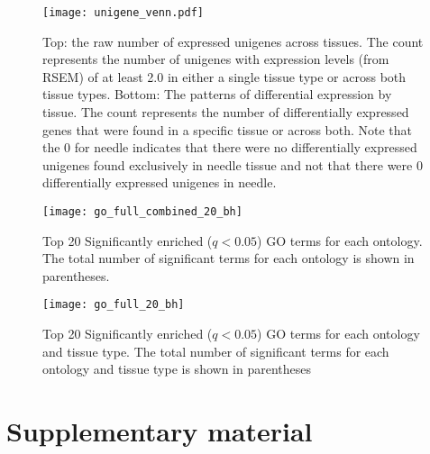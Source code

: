 \documentclass[11pt]{article}
\newcommand{\beginsupplement}{%
        \setcounter{table}{0}
        \renewcommand{\thetable}{S\arabic{table}}
        \setcounter{figure}{0}
        \renewcommand{\thefigure}{S\arabic{figure}}
        \renewcommand{\thesection}{S\arabic{section}}
        \renewcommand{\thesubsection}{S\arabic{subsection}} 
     }
\begin{document}
\clearpage

\singlespacing



\clearpage

\begin{figure}[t]
  \centering
  \texttt{[image: unigene\_venn.pdf]}
  \caption{Top: the raw number of expressed unigenes across tissues.  The count
    represents the number of unigenes with expression levels (from RSEM) of at
    least 2.0 in either a single tissue type or across both tissue types.
    Bottom: The patterns of differential expression by tissue.  The count
    represents the number of differentially expressed genes that were found in a
    specific tissue or across both.  Note that the 0 for needle indicates that
    there were no differentially expressed unigenes found exclusively in needle
    tissue and not that there were 0 differentially expressed unigenes in
    needle.}
  \label{fig:go_venn}
\end{figure}



\begin{figure}[t]
  \centering
  \texttt{[image: go\_full\_combined\_20\_bh]}
  \caption{Top 20 Significantly enriched ($q < 0.05$) GO terms for
    each ontology. The total number of significant terms for each
    ontology is shown in parentheses.}
  \label{fig:go_full_combined_20_bh}
\end{figure}


\begin{figure}[t]
  \centering
  \texttt{[image: go\_full\_20\_bh]}
  \caption{Top 20 Significantly enriched ($q < 0.05$) GO terms for
    each ontology and tissue type. The total number of significant
    terms for each ontology and tissue type is shown in parentheses}
  \label{fig:go_full_20_bh}
\end{figure}

\clearpage





\clearpage

\beginsupplement

\section*{Supplementary material}

\end{document}
